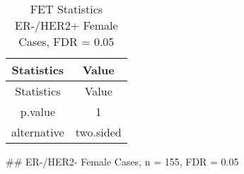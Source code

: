 \documentclass[]{article}
\begin{document}
\begin{longtable}[]{@{}cc@{}}
\caption{FET Statistics ER-/HER2+ Female Cases, FDR =
0.05}\tabularnewline
\toprule
\begin{minipage}[b]{0.18\columnwidth}\centering\strut
Statistics\strut
\end{minipage} & \begin{minipage}[b]{0.14\columnwidth}\centering\strut
Value\strut
\end{minipage}\tabularnewline
\midrule
\endfirsthead
\toprule
\begin{minipage}[b]{0.18\columnwidth}\centering\strut
Statistics\strut
\end{minipage} & \begin{minipage}[b]{0.14\columnwidth}\centering\strut
Value\strut
\end{minipage}\tabularnewline
\midrule
\endhead
\begin{minipage}[t]{0.18\columnwidth}\centering\strut
p.value\strut
\end{minipage} & \begin{minipage}[t]{0.14\columnwidth}\centering\strut
1\strut
\end{minipage}\tabularnewline
\begin{minipage}[t]{0.18\columnwidth}\centering\strut
alternative\strut
\end{minipage} & \begin{minipage}[t]{0.14\columnwidth}\centering\strut
two.sided\strut
\end{minipage}\tabularnewline
\bottomrule
\end{longtable}

\pagebreak
\#\# ER-/HER2- Female Cases, n = 155, FDR = 0.05
\end{document}
